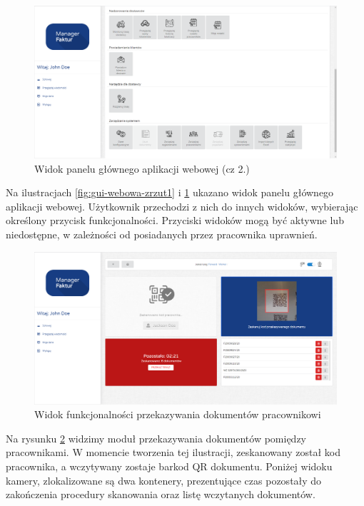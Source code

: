 \begin{figure}[ht]
 \centering
  \includegraphics[width=0.95\linewidth]{rys04/zrzut2}
 \caption{Widok panelu głównego aplikacji webowej (cz 2.)}
 \label{fig:gui-webowa-zrzut2}
\end{figure}

Na ilustracjach \ref{fig:gui-webowa-zrzut1} i \ref{fig:gui-webowa-zrzut2} ukazano widok panelu głównego aplikacji webowej. Użytkownik przechodzi z nich do innych widoków, wybierając określony przycisk funkcjonalności. Przyciski widoków mogą być aktywne lub niedostępne, w zależności od posiadanych przez pracownika uprawnień.

\begin{figure}[ht]
 \centering
  \includegraphics[width=0.95\linewidth]{rys04/zrzut3}
 \caption{Widok funkcjonalności przekazywania dokumentów pracownikowi}
 \label{fig:gui-webowa-zrzut3}
\end{figure}

Na rysunku \ref{fig:gui-webowa-zrzut3} widzimy moduł przekazywania dokumentów pomiędzy pracownikami. W momencie tworzenia tej ilustracji, zeskanowany został kod pracownika, a wczytywany zostaje barkod QR dokumentu. Poniżej widoku kamery, zlokalizowane są dwa kontenery, prezentujące czas pozostały do zakończenia procedury skanowania oraz listę wczytanych dokumentów.

